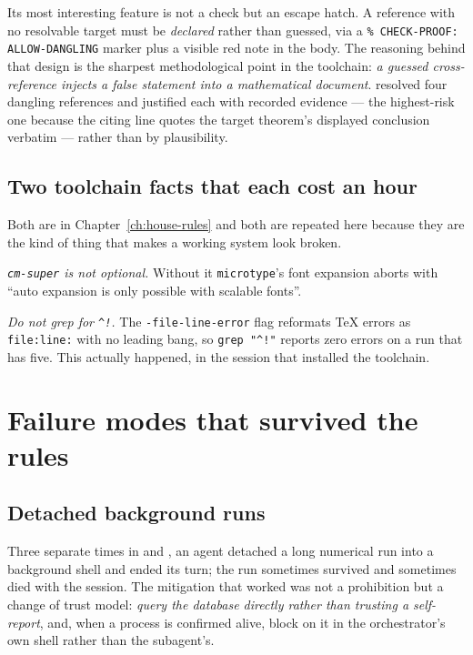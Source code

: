 Its most interesting feature is not a check but an escape hatch. A reference
with no resolvable target must be \emph{declared} rather than guessed, via a
\texttt{\% CHECK-PROOF: ALLOW-DANGLING} marker plus a visible red note in the
body. The reasoning behind that design is the sharpest methodological point in
the toolchain: \emph{a guessed cross-reference injects a false statement into a
mathematical document}.  resolved four dangling references and justified
each with recorded evidence --- the highest-risk one because the citing line
quotes the target theorem's displayed conclusion verbatim --- rather than by
plausibility.

\subsection{Two toolchain facts that each cost an hour}

Both are in Chapter~\ref{ch:house-rules} and both are repeated here because
they are the kind of thing that makes a working system look broken.

\emph{\texttt{cm-super} is not optional.} Without it \texttt{microtype}'s font
expansion aborts with ``auto expansion is only possible with scalable
fonts''.

\emph{Do not grep for \texttt{\^{}!}.} The \texttt{-file-line-error} flag
reformats \TeX{} errors as \texttt{file:line:} with no leading bang, so
\verb|grep "^!"| reports zero errors on a run that has five. This actually
happened, in the session that installed the toolchain.

\section{Failure modes that survived the rules}
\label{sec:surviving-failures}

\subsection{Detached background runs}

Three separate times in  and , an agent detached a long
numerical run into a background shell and ended its turn; the run sometimes
survived and sometimes died with the session. The mitigation that worked was
not a prohibition but a change of trust model: \emph{query the database
directly rather than trusting a self-report}, and, when a process is confirmed
alive, block on it in the orchestrator's own shell rather than the subagent's.

